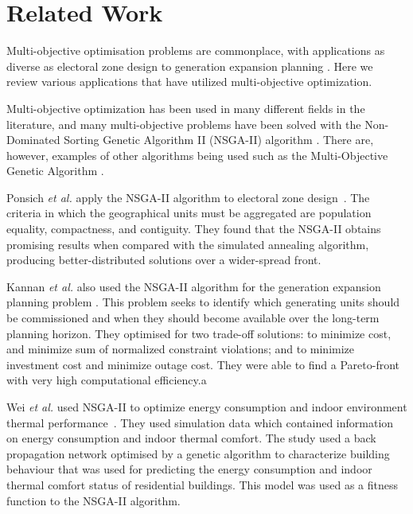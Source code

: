 \documentclass[10pt, conference, compsocconf]{IEEEtran}
\begin{document}
\section{Related Work}
\label{relatedWork}

Multi-objective optimisation problems are commonplace, with applications as diverse as electoral zone design \cite{Ponsich2017} to generation expansion planning \cite{Kannan2009}. Here we review various applications that have utilized multi-objective optimization.

Multi-objective optimization has been used in many different fields in the literature, and many multi-objective problems have been solved with the Non-Dominated Sorting Genetic Algorithm II (NSGA-II) algorithm \cite{Valkanas2014}. There are, however, examples of other algorithms being used such as the Multi-Objective Genetic Algorithm \cite{T.MurataandH.Ishibuchi1995}.

Ponsich \textit{et al.} apply the NSGA-II algorithm to electoral zone design~\cite{Ponsich2017}. The criteria in which the geographical units must be aggregated are population equality, compactness, and contiguity. They found that the NSGA-II obtains promising results when compared with the simulated annealing algorithm, producing better-distributed solutions over a wider-spread front.

Kannan \textit{et al.} also used the NSGA-II algorithm for the generation expansion planning problem  \cite{Kannan2009}. This problem seeks to identify which generating units should be commissioned and when they should become available over the long-term planning horizon. They optimised for two trade-off solutions: to minimize cost, and minimize sum of normalized constraint violations; and to minimize investment cost and minimize outage cost. They  were able to find a Pareto-front with very high computational efficiency.a

Wei \textit{et al.} used NSGA-II to optimize energy consumption and indoor environment thermal performance~\cite{Yu2015a}. They used simulation data which contained information on energy consumption and indoor thermal comfort. The study used a back propagation network optimised by a genetic algorithm to characterize building behaviour that was used for predicting the energy consumption and indoor thermal comfort status of residential buildings. This model was used as a fitness function to the NSGA-II algorithm.
\end{document}
